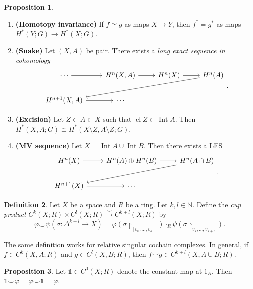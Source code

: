 \documentclass[10pt,letterpaper,cm]{nupset}
\theoremstyle{definition}
\newtheorem{definition}{Definition}[subsection]
\theoremstyle{theorem}
\newtheorem{prop}[definition]{Proposition}
\theoremstyle{remark}
\newcommand{\N}{\mathbb N}
\newcommand{\1}{\mathbb{1}}
\newcommand{\0}{\vec 0}
\DeclareMathOperator{\Int}{Int}
\DeclareMathOperator{\cl}{cl}
\begin{document}
\begin{prop} $ $
\begin{enumerate}
\item  {\textbf{(Homotopy invariance)}} If $f \simeq g$ as maps $X \to Y$, then $f^{\ast} = g^{\ast}$ as maps $H^{\ast}(Y; G) \to H^{\ast}(X; G)$.
\item {\textbf{(Snake)}} Let $(X, A)$ be pair. There exists a \textit{long exact sequence in cohomology}
\[
\begin{tikzcd}
\cdots \arrow[r]         & {H^n(X, A)} \arrow[r] & H^n(X) \arrow[r] & H^n(A) \arrow[llld] \\
{H^{n+1}(X,A)} \arrow[r] & \cdots                &                  &                    
\end{tikzcd}
.\]
\item {\textbf{(Excision)}} Let $Z \subset A \subset X$ such that $\cl{Z} \subset \Int{A}$. Then $H^{\ast}(X, A; G) \cong H^{\ast}(X \setminus Z, A \setminus Z; G)$.
\item {\textbf{(MV sequence)}} Let $X = \Int{A} \cup \Int{B}$. Then there exists a LES
\[
\begin{tikzcd}
H^n(X) \arrow[r]     & H^n(A) \oplus H^n(B) \arrow[r] & H^n(A \cap B) \arrow[lld] \\
H^{n+1}(X) \arrow[r] & \cdots                         &                          
\end{tikzcd}
.\]
\end{enumerate}
\end{prop}

\begin{definition}
Let $X$ be a space and $R$ be a ring. Let $k, l \in \N$. Define the \textit{cup product} $C^k(X; R) \times C^l(X; R) \overset{\smile}{\longrightarrow} C^{k+l}(X; R)$ by $$\varphi \smile \psi(\sigma: \Delta^{k+l} \to X) = \varphi(\sigma \restriction_{\left[v_0, \ldots, v_k\right]}) \cdot_R \psi(\sigma \restriction_{v_k, \ldots, v_{k+l}}).$$
\end{definition}


The same definition works for relative singular cochain complexes. In general, if $f\in C^k(X, A; R)$ and $g \in C^l(X, B; R)$, then $f\smile g  \in  C^{k+l}(X, A \cup B; R) .$


\begin{prop} 
Let $\1 \in C^0(X; R)$ denote the constant map at $1_R$. Then $\1 \smile \varphi = \varphi \smile \1 = \varphi$.
\end{prop}
\end{document}
